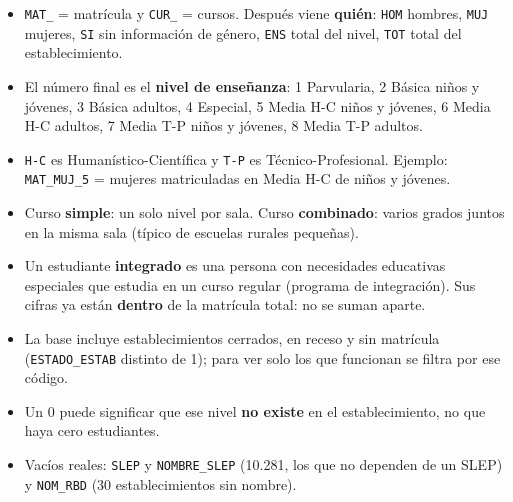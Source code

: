 \documentclass[10.5pt]{article}
\begin{document}
\begin{estrategiabox}
\begin{itemize}[leftmargin=1.1em,itemsep=2pt,topsep=2pt]
\item \texttt{MAT\_\allowbreak{}} = matrícula y \texttt{CUR\_\allowbreak{}} = cursos. Después viene \textbf{quién}: \texttt{HOM} hombres, \texttt{MUJ} mujeres, \texttt{SI} sin información de género, \texttt{ENS} total del nivel, \texttt{TOT} total del establecimiento.
\item El número final es el \textbf{nivel de enseñanza}: 1 Parvularia, 2 Básica niños y jóvenes, 3 Básica adultos, 4 Especial, 5 Media H-C niños y jóvenes, 6 Media H-C adultos, 7 Media T-P niños y jóvenes, 8 Media T-P adultos.
\item \texttt{H-C} es Humanístico-Científica y \texttt{T-P} es Técnico-Profesional. Ejemplo: \texttt{MAT\_\allowbreak{}MUJ\_\allowbreak{}5} = mujeres matriculadas en Media H-C de niños y jóvenes.
\item Curso \textbf{simple}: un solo nivel por sala. Curso \textbf{combinado}: varios grados juntos en la misma sala (típico de escuelas rurales pequeñas).
\end{itemize}
\end{estrategiabox}

\begin{alertabox}
\begin{itemize}[leftmargin=1.1em,itemsep=2pt,topsep=2pt]
\item Un estudiante \textbf{integrado} es una persona con necesidades educativas especiales que estudia en un curso regular (programa de integración). Sus cifras ya están \textbf{dentro} de la matrícula total: no se suman aparte.
\item La base incluye establecimientos cerrados, en receso y sin matrícula (\texttt{ESTADO\_\allowbreak{}ESTAB} distinto de 1); para ver solo los que funcionan se filtra por ese código.
\item Un 0 puede significar que ese nivel \textbf{no existe} en el establecimiento, no que haya cero estudiantes.
\item Vacíos reales: \texttt{SLEP} y \texttt{NOMBRE\_\allowbreak{}SLEP} (10.281, los que no dependen de un SLEP) y \texttt{NOM\_\allowbreak{}RBD} (30 establecimientos sin nombre).
\end{itemize}
\end{alertabox}

\newpage
{}\label{base6}\hypertarget{base6}{}
\end{document}
